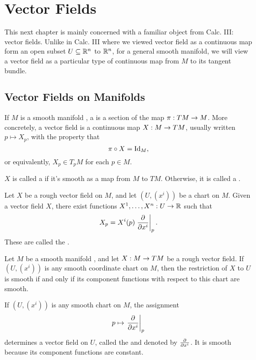\newpage\setcounter{section}{7}
\section{Vector Fields}

This next chapter is mainly concerned with a familiar object from Calc. III: vector fields. Unlike in Calc. III where we viewed vector field as a continuous map form an open subset $U\subseteq \mathbb{R}^n$ to $\mathbb{R}^n$, for a general smooth manifold, we will view a vector field as a particular type of continuous map from $M$ to its tangent bundle.

\subsection{Vector Fields on Manifolds}\nl

\dfn If $M$ is a smooth manifold \wowob, a  is a section of the map $\pi:TM\rightarrow M$. More concretely, a vector field is a continuous map $X:M\rightarrow TM$, usually written $p\mapsto X_p$, with the property that
\[\pi\circ X = \text{Id}_M,\]
or equivalently, $X_p\in T_pM$ for each $p\in M$.

\dfn $X$ is called a  if it's smooth as a map from $M$ to $TM$. Otherwise, it is called a .

\dfn Let $X$ be a rough vector field on $M$, and let $(U, (x^i))$ be a chart on $M$. Given a vector field $X$, there exist functions $X^1,\ldots,X^n:U\rightarrow \mathbb{R}$ such that
\[X_p = X^i(p)\left. \frac{\partial}{\partial x^i}\right|_{p}.\]
These are called the .

\begin{prop}
Let $M$ be a smooth manifold \wowob, and let $X:M\rightarrow TM$ be a rough vector field. If $(U, (x^i))$ is any smooth coordinate chart on $M$, then the restriction of $X$ to $U$ is smooth if and only if its component functions with respect to this chart are smooth.
\end{prop}

\begin{ex}
If $(U, (x^i))$ is any smooth chart on $M$, the assignment
\[p\mapsto\left. \frac{\partial}{\partial x^i}\right|_{p}\]
determines a vector field on $U$, called the  and denoted by $\frac{\partial}{\partial x^i}$. It is smooth because its component functions are constant.
\end{ex}

\setcounter{thm}{3}

